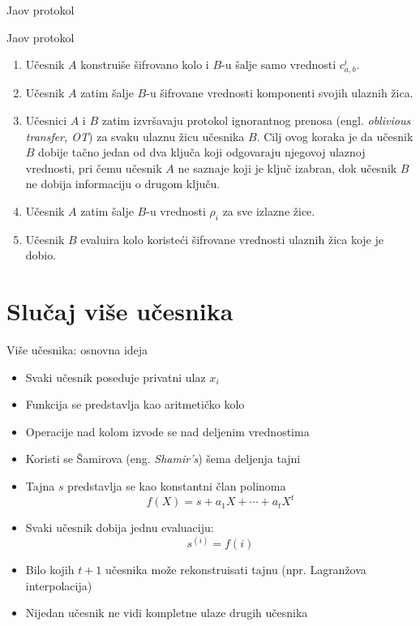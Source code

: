 \documentclass[aspectratio=1610]{beamer}
\begin{document}
\begin{frame}{Jaov protokol}
\begin{pblock}{Jaov protokol}
    \begin{enumerate}
        \item Učesnik $A$ konstruiše šifrovano kolo i $B$-u šalje samo vrednosti $c_{a,b}^i$.
        \item Učesnik $A$ zatim šalje $B$-u šifrovane vrednosti komponenti svojih ulaznih žica. 
        \item Učesnici $A$ i $B$ zatim izvršavaju protokol ignorantnog prenosa (engl. \textit{oblivious transfer, OT}) za svaku ulaznu žicu učesnika $B$. Cilj ovog koraka je da učesnik $B$ dobije tačno jedan od dva ključa koji odgovaraju njegovoj ulaznoj vrednosti, pri čemu učesnik $A$ ne saznaje koji je ključ izabran, dok učesnik $B$ ne dobija informaciju o drugom ključu.
        \item Učesnik $A$ zatim šalje $B$-u vrednosti $\rho_i$ za sve izlazne žice.
        \item Učesnik $B$ evaluira kolo koristeći šifrovane vrednosti ulaznih žica koje je dobio.
    \end{enumerate}
\end{pblock}
\end{frame}

\section{Slučaj više učesnika}
\begin{frame}{Više učesnika: osnovna ideja}
\begin{itemize}
    \item Svaki učesnik poseduje privatni ulaz $x_i$
    \item Funkcija se predstavlja kao aritmetičko kolo
    \item Operacije nad kolom izvode se nad deljenim vrednostima
    \item Koristi se Šamirova (eng. \textit{Shamir's}) šema deljenja tajni
    \item Tajna $s$ predstavlja se kao konstantni član polinoma
    \[
    f(X)=s+a_1X+\cdots+a_tX^t
    \]
    
    \item Svaki učesnik dobija jednu evaluaciju:
    \[
    s^{(i)}=f(i)
    \]

    \item Bilo kojih $t+1$ učesnika može rekonstruisati tajnu (npr. Lagranžova interpolacija)
    \item Nijedan učesnik ne vidi kompletne ulaze drugih učesnika
\end{itemize}

\end{frame}
\end{document}
